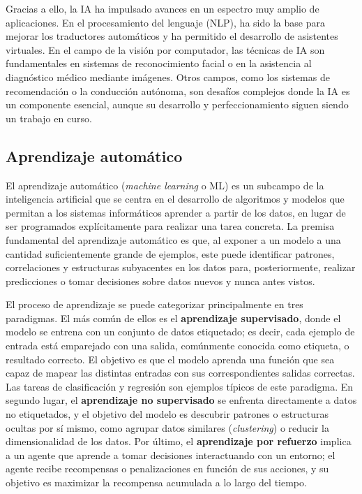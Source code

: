 Gracias a ello, la IA ha impulsado avances en un espectro muy amplio de aplicaciones. En el procesamiento del lenguaje (NLP), ha sido la base para mejorar los traductores automáticos y ha permitido el desarrollo de asistentes virtuales. En el campo de la visión por computador, las técnicas de IA son fundamentales en sistemas de reconocimiento facial o en la asistencia al diagnóstico médico mediante imágenes. Otros campos, como los sistemas de recomendación o la conducción autónoma, son desafíos complejos donde la IA es un componente esencial, aunque su desarrollo y perfeccionamiento siguen siendo un trabajo en curso.

\subsection{Aprendizaje automático}

El aprendizaje automático (\textit{machine learning} o ML) es un subcampo de la inteligencia artificial que se centra en el desarrollo de algoritmos y modelos que permitan a los sistemas informáticos aprender a partir de los datos, en lugar de ser programados explícitamente para realizar una tarea concreta. La premisa fundamental del aprendizaje automático es que, al exponer a un modelo a una cantidad suficientemente grande de ejemplos, este puede identificar patrones, correlaciones y estructuras subyacentes en los datos para, posteriormente, realizar predicciones o tomar decisiones sobre datos nuevos y nunca antes vistos.

El proceso de aprendizaje se puede categorizar principalmente en tres paradigmas. El más común de ellos es el \textbf{aprendizaje supervisado}, donde el modelo se entrena con un conjunto de datos etiquetado; es decir, cada ejemplo de entrada está emparejado con una salida, comúnmente conocida como etiqueta, o resultado correcto. El objetivo es que el modelo aprenda una función que sea capaz de mapear las distintas entradas con sus correspondientes salidas correctas. Las tareas de clasificación y regresión son ejemplos típicos de este paradigma. En segundo lugar, el \textbf{aprendizaje no supervisado} se enfrenta directamente a datos no etiquetados, y el objetivo del modelo es descubrir patrones o estructuras ocultas por sí mismo, como agrupar datos similares (\textit{clustering}) o reducir la dimensionalidad de los datos. Por último, el \textbf{aprendizaje por refuerzo} implica a un agente que aprende a tomar decisiones interactuando con un entorno; el agente recibe recompensas o penalizaciones en función de sus acciones, y su objetivo es maximizar la recompensa acumulada a lo largo del tiempo.

